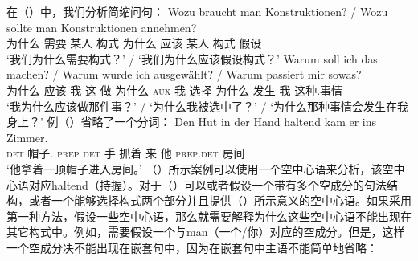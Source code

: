 \begin{exe}
\begin{xlist}[iv.]
\begin{exe}
\begin{xlist}[iv.]
\z
在（）中，我们分析简缩问句：
\eal
\ex 
\gll Wozu braucht man Konstruktionen? / Wozu sollte man Konstruktionen annehmen?\\
     为什么 需要 某人 构式 {} 为什么 应该 某人 构式 假设\\
\glt `我们为什么需要构式？' / `我们为什么应该假设构式？'
\ex 
\gll Warum soll ich das machen? / Warum wurde ich ausgewählt? / Warum passiert mir sowas?\\
	 为什么 应该 我 这 做 {} 为什么 \textsc{aux} 我 选择 {} 为什么 发生 我 这种.事情\\
\glt `我为什么应该做那件事？' / `为什么我被选中了？' / `为什么那种事情会发生在我身上？'
\zl
例（）省略了一个分词：
\ea
\gll Den Hut in der Hand haltend kam er ins Zimmer.\\
	 \textsc{det} 帽子.\acc{} \textsc{prep} \textsc{det} 手 抓着 来 他 \textsc{prep}.\textsc{det} 房间\\
\glt `他拿着一顶帽子进入房间。'
\z
（）所示案例可以使用一个空中心语来分析，该空中心语对应haltend（持握）。对于（）可以或者假设一个带有多个空成分的句法结构，或者一个能够选择构式两个部分并且提供（）所示意义的空中心语。如果采用第一种方法，假设一些空中心语，那么就需要解释为什么这些空中心语不能出现在其它构式中。例如，需要假设一个与man（一个/你）对应的空成分。但是，这样一个空成分决不能出现在嵌套句中，因为在嵌套句中主语不能简单地省略：

\end{xlist}
\end{exe}
\end{xlist}
\end{exe}
